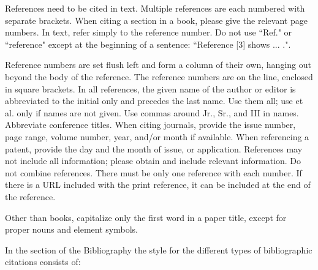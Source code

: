 \documentclass[eng]{ajceam-class}
\begin{document}
References need to be cited in text. Multiple references are each numbered with separate brackets. When citing a section in a book, please give the relevant page numbers. In text, refer simply to the reference number. Do not use ``Ref." or ``reference" except at the beginning of a sentence: ``Reference [3] shows ... .".

Reference numbers are set flush left and form a column of their own, hanging out beyond the body of the reference. The reference numbers are on the line, enclosed in square brackets. In all references, the given name of the author or editor is abbreviated to the initial only and precedes the last name. Use them all; use et al. only if names are not given. Use commas around Jr., Sr., and III in names. Abbreviate conference titles.  When citing journals, provide the issue number, page range, volume number, year, and/or month if available. When referencing a patent, provide the day and the month of issue, or application. References may not include all information; please obtain and include relevant information. Do not combine references. There must be only one reference with each number. If there is a URL included with the print reference, it can be included at the end of the reference.

Other than books, capitalize only the first word in a paper title, except for proper nouns and element symbols.


In the section of the Bibliography the style for the different types of bibliographic citations consists of:
\end{document}
